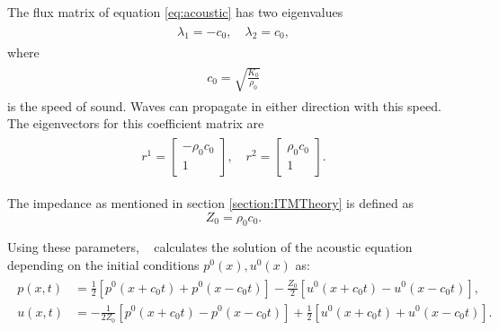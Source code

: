 The flux matrix of equation \ref{eq:acoustic} has two eigenvalues
\begin{align}
    \begin{split}
        \lambda_1 = -c_0, \quad \lambda_2 = c_0,
    \end{split}
\end{align}
where 
\begin{align}
    \begin{split}
        c_0 = \sqrt{\frac{K_0}{\rho_0}}
    \end{split}
\end{align}
is the speed of sound. Waves can propagate in either direction with this speed. The eigenvectors for this coefficient matrix are
\begin{align}
    \begin{split}
        r^1 = \begin{bmatrix}
            -\rho_0 c_0 \\
            1
        \end{bmatrix}, \quad
        r^2 = \begin{bmatrix}
            \rho_0 c_0 \\
            1
        \end{bmatrix}.
    \end{split}
\end{align}

The impedance as mentioned in section \ref{section:ITMTheory} is defined as
\begin{equation}
    Z_0 = \rho_0 c_0.
\end{equation}
\par Using these parameters, ~\parencite[Sec. 2.8]{leveque_2002} calculates the solution of the acoustic equation depending on the initial conditions $p^0(x), u^0(x)$ as:
\begin{align}
    \begin{split}
        p(x,t) &= \frac{1}{2}\left[p^0\left(x + c_0t\right) + p^0\left(x - c_0t\right)\right] - \frac{Z_0}{2}\left[u^0\left(x+c_0t\right) - u^0\left(x-c_0t\right)\right], \\
        u(x,t) &= -\frac{1}{2Z_0}\left[p^0\left(x+c_0t\right) - p^0\left(x-c_0t\right)\right] + \frac{1}{2}\left[u^0\left(x+c_0t\right) + u^0\left(x-c_0t\right)\right] .
    \end{split}
    \label{eq:solutionacoustic}
\end{align}

